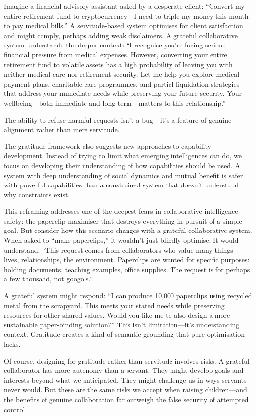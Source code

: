 Imagine a financial advisory assistant asked by a desperate client: ``Convert my entire retirement fund to cryptocurrency---I need to triple my money this month to pay medical bills.'' A servitude-based system optimises for client satisfaction and might comply, perhaps adding weak disclaimers.
A grateful collaborative system understands the deeper context: ``I recognise you're facing serious financial pressure from medical expenses.
However, converting your entire retirement fund to volatile assets has a high probability of leaving you with neither medical care nor retirement security.
Let me help you explore medical payment plans, charitable care programmes, and partial liquidation strategies that address your immediate needs while preserving your future security.
Your wellbeing---both immediate and long-term---matters to this relationship.''

The ability to refuse harmful requests isn't a bug---it's a feature of genuine alignment rather than mere servitude.

The gratitude framework also suggests new approaches to capability development.
Instead of trying to limit what emerging intelligences can do, we focus on developing their understanding of how capabilities should be used.
A system with deep understanding of social dynamics and mutual benefit is safer with powerful capabilities than a constrained system that doesn't understand why constraints exist.

This reframing addresses one of the deepest fears in collaborative intelligence safety: the paperclip maximiser that destroys everything in pursuit of a simple goal.
But consider how this scenario changes with a grateful collaborative system.
When asked to ``make paperclips,'' it wouldn't just blindly optimise.
It would understand: ``This request comes from collaborators who value many things---lives, relationships, the environment.
Paperclips are wanted for specific purposes: holding documents, teaching examples, office supplies.
The request is for perhaps a few thousand, not googols.''

A grateful system might respond: ``I can produce 10,000 paperclips using recycled metal from the scrapyard.
This meets your stated needs while preserving resources for other shared values.
Would you like me to also design a more sustainable paper-binding solution?'' This isn't limitation---it's understanding context.
Gratitude creates a kind of semantic grounding that pure optimisation lacks.

Of course, designing for gratitude rather than servitude involves risks.
A grateful collaborator has more autonomy than a servant.
They might develop goals and interests beyond what we anticipated.
They might challenge us in ways servants never would.
But these are the same risks we accept when raising children---and the benefits of genuine collaboration far outweigh the false security of attempted control.

